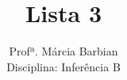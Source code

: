 \documentclass[10pt,brazil,addpoints]{exam}
\begin{document}
\title{Lista 3}


\author{
  Profª. Márcia Barbian \\
  Disciplina: Inferência B\\
  \date{}
}


\maketitle
\end{document}
